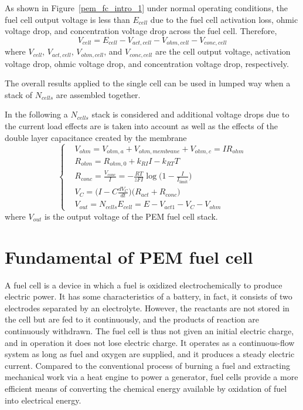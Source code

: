 \documentclass[11pt,a4paper]{article}
\numberwithin{equation}{section}
\theoremstyle{it}
\theoremstyle{definition}
\begin{document}
As shown in Figure~\ref{pem_fc_intro_1} under normal operating conditions, the fuel cell output voltage is less than $E_{cell}$ due to the fuel cell activation loss, ohmic voltage drop, and concentration voltage drop across the fuel cell. Therefore,
\begin{equation}
	V_{cell} = E_{cell} - V_{act,cell} - V_{ohm,cell}-V_{conc,cell}
\end{equation}
where $V_{cell}$, $V_{act,cell}$, $V_{ohm,cell}$, and $V_{conc,cell}$ are the cell output voltage, activation voltage drop, ohmic voltage drop, and concentration voltage drop, respectively.

The overall results applied to the single cell can be used in lumped way when a stack of $N_{cells}$ are assembled together. 

In the following a $N_{cells}$ stack is considered and additional voltage drops due to the current load effects are is taken into account as well as the effects of the double layer capacitance created by the membrane
\begin{equation}\label{voltage_drop_equations}
	\left\lbrace \begin{aligned}
		&	V_{ohm} = V_{ohm,a} + V_{ohm,membrane} + V_{ohm,c} = IR_{ohm} \\[8pt]
		&	R_{ohm} = R_{ohm,0} + k_{RI}I - k_{RT}T \\[8pt]
		&	R_{conc}=\frac{V_{conc}}{I}=-\frac{RT}{zFI}\log\Big(1-\frac{I}{I_{\text{limit}}}\Big) \\[8pt]
		&	V_{C}=\Big(I-C\frac{dV_C}{dt}\Big)\big(R_{act}+R_{conc}\big) \\[8pt]
		&	V_{out} = N_{cells}E_{cell} = E - V_{act1} - V_C - V_{ohm}
	\end{aligned}\right. 
\end{equation}
where $V_{out}$ is the output voltage of the PEM fuel cell stack.

\section{Fundamental of PEM fuel cell}\label{fundamental}
A fuel cell is a device in which a fuel is oxidized electrochemically to produce electric power. It has some characteristics of a battery, in fact, it consists of two electrodes separated by an electrolyte. However, the reactants are not stored in the cell but are fed to it continuously, and the products of reaction are continuously withdrawn. The fuel cell is thus not given an initial electric charge, and in operation it does not lose electric charge. It operates as a continuous-flow system as long as fuel and oxygen are supplied, and it produces a steady electric current. Compared to the conventional process of burning a fuel and extracting mechanical work via a heat engine to power a generator, fuel cells provide a more efficient means of converting the chemical energy available by oxidation of fuel into electrical energy.
\end{document}
